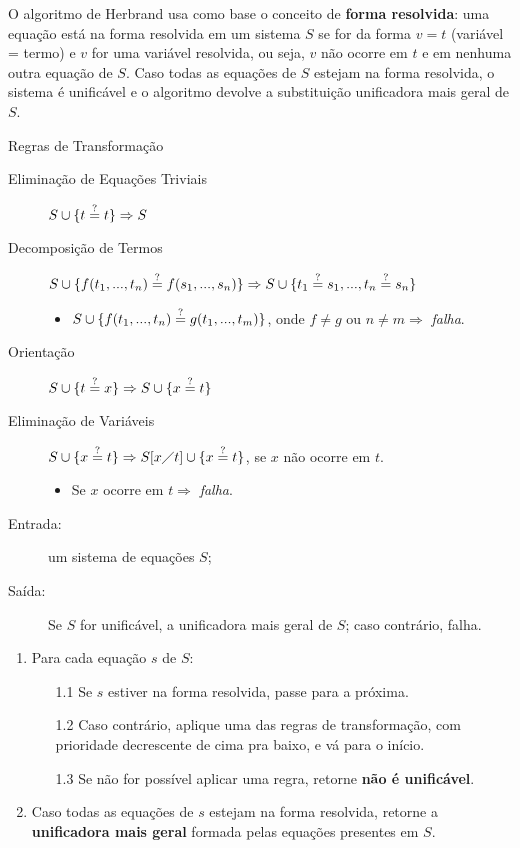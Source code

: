 O algoritmo de Herbrand usa como base o conceito de \textbf{forma resolvida}: uma equação está na forma resolvida em um sistema $S$ se for da forma $v = t$ (variável = termo) e $v$ for uma variável resolvida, ou seja, $v$ não ocorre em $t$ e em nenhuma outra equação de $S$. Caso todas as equações de $S$ estejam na forma resolvida, o sistema é unificável e o algoritmo devolve a substituição unificadora mais geral de $S$.

\begin{definition}{Regras de Transformação}
    \begin{description}
        \item[Eliminação de Equações Triviais] $S \cup \{t \overset{?}{=} t\} \Rightarrow S$
        \item[Decomposição de Termos] $S \cup \{f(t_1,...,t_n) \overset{?}{=} f(s_1,...,s_n)\} \Rightarrow S \cup \{t_1 \overset{?}{=} s_1,...,t_n \overset{?}{=} s_n\}$
        \begin{itemize}
            \item $S \cup \{f(t_1,...,t_n) \overset{?}{=} g(t_1,...,t_m)\}$, onde $f \neq g$ ou $n \neq m \Rightarrow$ \textit{falha}.
        \end{itemize}  
        \item[Orientação] $S \cup \{t \overset{?}{=} x\} \Rightarrow S \cup \{x \overset{?}{=} t\}$ 
        \item[Eliminação de Variáveis] $S \cup \{x \overset{?}{=} t\} \Rightarrow S[x\diagup t] \cup \{x \overset{?}{=} t\}$, se $x$ não ocorre em $t$.
        \begin{itemize}
            \item Se $x$ ocorre em $t \Rightarrow$ \textit{falha}.
        \end{itemize}
    \end{description}
    \begin{description}
        \item[Entrada:] um sistema de equações $S$;
        \item[Saída:] Se $S$ for unificável, a unificadora mais geral de $S$; caso contrário, falha.
    \end{description}
    \begin{enumerate}
        \item Para cada equação $s$ de $S$:
        \begin{enumerate}
            \item [1.1] Se $s$ estiver na forma resolvida, passe para a próxima.
            \item [1.2] Caso contrário, aplique uma das regras de transformação, com prioridade decrescente de cima pra baixo, e vá para o início.
            \item [1.3] Se não for possível aplicar uma regra, retorne \textbf{não é unificável}.
        \end{enumerate}
        \item Caso todas as equações de $s$ estejam na forma resolvida, retorne a \textbf{unificadora mais geral} formada pelas equações presentes em $S$.
    \end{enumerate}
\end{definition}

